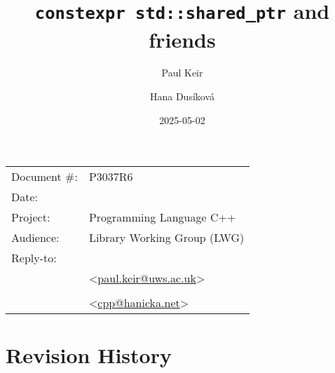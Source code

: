 \documentclass[10pt]{article}
\date{}
\title{\texttt{constexpr std::shared\_ptr} and friends}
\makeatletter
\newcommand{\emailaddressP}{paul.keir@uws.ac.uk}
\newcommand{\emailaddressH}{cpp@hanicka.net}
\newcommand{\emailP}{\href{mailto:\emailaddressP}{\emailaddressP}}
\newcommand{\emailH}{\href{mailto:\emailaddressH}{\emailaddressH}}
\makeatother
\begin{document}

\maketitle\vspace{-2cm}

\begin{flushright}
  \begin{tabular}{ll}
  Document \#:&P3037R6\\
  Date:       &\date{2025-05-02}\\
  Project:    &Programming Language C++\\
  Audience:   &Library Working Group (LWG)\\
  Reply-to:   &\author{Paul Keir}\\
              &\textless\emailP\textgreater\\
              &\author{Hana Dusíková}\\
              &\textless\emailH\textgreater
  \end{tabular}
\end{flushright}

{\hypersetup{linkcolor=black}
  \tableofcontents
}

\pagebreak

\section{Revision History}
\end{document}
